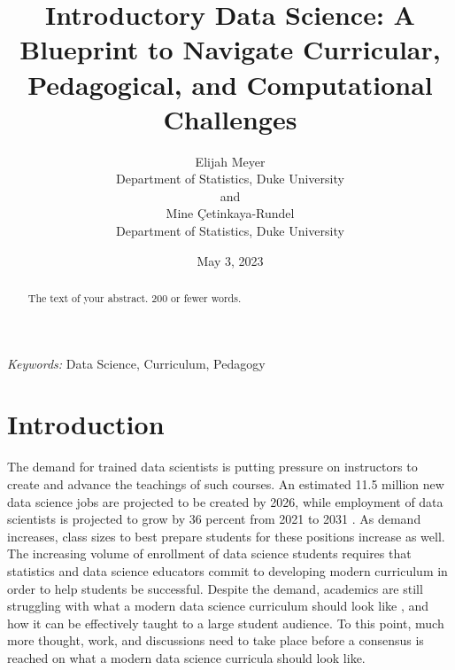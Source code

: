 \documentclass[
  12pt]{article}
\begin{document}
\def\spacingset#1{\renewcommand{\baselinestretch}%
{#1}\small\normalsize} \spacingset{1}



\date{May 3, 2023}
\title{\bf Introductory Data Science: A Blueprint to Navigate
Curricular, Pedagogical, and Computational Challenges}
\author{
Elijah Meyer\\
Department of Statistics, Duke University\\
and\\Mine Çetinkaya-Rundel\\
Department of Statistics, Duke University\\
}
\maketitle

\bigskip
\bigskip
\begin{abstract}
The text of your abstract. 200 or fewer words.
\end{abstract}

\noindent%
{\it Keywords:} Data Science, Curriculum, Pedagogy
\vfill

\newpage
\spacingset{1.9} %
\ifdefined\Shaded\renewenvironment{Shaded}{\begin{tcolorbox}[borderline west={3pt}{0pt}{shadecolor}, interior hidden, sharp corners, enhanced, breakable, boxrule=0pt, frame hidden]}{\end{tcolorbox}}\fi

\hypertarget{introduction}{%
\section{Introduction}\label{introduction}}

The demand for trained data scientists is putting pressure on
instructors to create and advance the teachings of such courses. An
estimated 11.5 million new data science jobs are projected to be created
by 2026, while employment of data scientists is projected to grow by 36
percent from 2021 to 2031 \citep{labor_2022}. As demand increases, class
sizes to best prepare students for these positions increase as well. The
increasing volume of enrollment of data science students
\citep{Redmond2022} requires that statistics and data science educators
commit to developing modern curriculum in order to help students be
successful. Despite the demand, academics are still struggling with what
a modern data science curriculum should look like \citep{Schwab2020},
and how it can be effectively taught to a large student audience. To
this point, much more thought, work, and discussions need to take place
before a consensus is reached on what a modern data science curricula
should look like.
\end{document}
